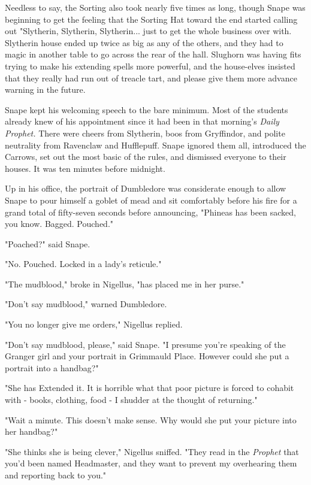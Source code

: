 \documentclass[a4paper,11pt]{article}
\begin{document}
Needless to say, the Sorting also took nearly five times as long, though Snape was beginning to get the feeling that the Sorting Hat toward the end started calling out "Slytherin, Slytherin, Slytherin... just to get the whole business over with. Slytherin house ended up twice as big as any of the others, and they had to magic in another table to go across the rear of the hall. Slughorn was having fits trying to make his extending spells more powerful, and the house-elves insisted that they really had run out of treacle tart, and please give them more advance warning in the future.

Snape kept his welcoming speech to the bare minimum. Most of the students already knew of his appointment since it had been in that morning's \emph{Daily Prophet.} There were cheers from Slytherin, boos from Gryffindor, and polite neutrality from Ravenclaw and Hufflepuff. Snape ignored them all, introduced the Carrows, set out the most basic of the rules, and dismissed everyone to their houses. It was ten minutes before midnight.

Up in his office, the portrait of Dumbledore was considerate enough to allow Snape to pour himself a goblet of mead and sit comfortably before his fire for a grand total of fifty-seven seconds before announcing, "Phineas has been sacked, you know. Bagged. Pouched."

"Poached?" said Snape.

"No. Pouched. Locked in a lady's reticule."

"The mudblood," broke in Nigellus, "has placed me in her purse."

"Don't say mudblood," warned Dumbledore.

"You no longer give me orders," Nigellus replied.

"Don't say mudblood, please," said Snape. "I presume you're speaking of the Granger girl and your portrait in Grimmauld Place. However could she put a portrait into a handbag?"

"She has Extended it. It is horrible what that poor picture is forced to cohabit with - books, clothing, food - I shudder at the thought of returning."

"Wait a minute. This doesn't make sense. Why would she put your picture into her handbag?"

"She thinks she is being clever," Nigellus sniffed. "They read in the \emph{Prophet} that you'd been named Headmaster, and they want to prevent my overhearing them and reporting back to you."
\end{document}
